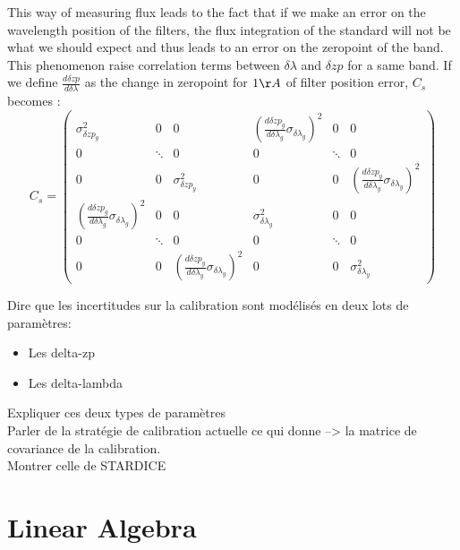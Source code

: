 \documentclass[\docopts]{\docclass}
\begin{document}
This way of measuring flux leads to the fact that if we make an error on the wavelength position of the filters, the flux integration of the standard will not be what we should expect and thus leads to an error on the zeropoint of the band.
This phenomenon raise correlation terms between $\delta \lambda$ and $\delta zp$ for a same band. If we define $\frac{d \delta zp}{d \delta \lambda}$ as the change in zeropoint for $1\AA$ of filter position error, $C_s$ becomes :
\begin{equation}
\label{eq::cov_calib}
C_s = 
\begin{pmatrix}
   \sigma^2_{\delta zp_{g}} & 0 & 0 & (\frac{d \delta zp_g}{d \delta \lambda_g} \sigma_{\delta \lambda_g})^2 & 0 & 0 \\
   0 & \ddots & 0 & 0 & \ddots & 0 \\
   0 & 0 & \sigma^2_{\delta zp_{y}} & 0 & 0 & (\frac{d \delta zp_y}{d \delta \lambda_y} \sigma_{\delta \lambda_y})^2 \\
   (\frac{d \delta zp_g}{d \delta \lambda_g} \sigma_{\delta \lambda_g})^2 & 0 & 0 & \sigma^2_{\delta\lambda_{g}} & 0 & 0 \\
   0 & \ddots & 0 & 0 & \ddots & 0 \\
   0 & 0 & (\frac{d \delta zp_y}{d \delta \lambda_y} \sigma_{\delta \lambda_y})^2 & 0 & 0 & \sigma^2_{\delta\lambda_{y}}
\end{pmatrix}
\end{equation}


Dire que les incertitudes sur la calibration sont modélisés en deux lots de paramètres:
\begin{itemize}
\item Les delta-zp
\item Les delta-lambda
\end{itemize}
Expliquer ces deux types de paramètres\\
Parler de la stratégie de calibration actuelle ce qui donne --> la matrice de covariance de la calibration.\\
Montrer celle de STARDICE


\section{Linear Algebra}
\label{sec::linalg}
\end{document}
